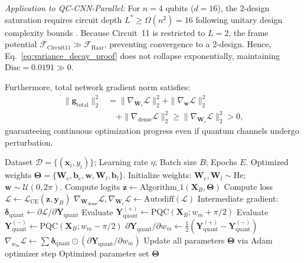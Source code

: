 \documentclass[journal]{IEEEtran}
\begin{document}
\textit{Application to QC-CNN-Parallel:} For $n=4$ qubits ($d=16$), the 2-design saturation requires circuit depth $L^* \ge \Omega(n^2) = 16$ following unitary design complexity bounds \cite{haferkamp2022linear}. Because Circuit~11 is restricted to $L=2$, the frame potential $\mathcal{F}_{\mathrm{Circuit11}} \gg \mathcal{F}_{\mathrm{Haar}}$, preventing convergence to a 2-design. Hence, Eq.~\eqref{eq:variance_decay_proof} does not collapse exponentially, maintaining $\mathrm{Disc} = 0.0191 \gg 0$.

Furthermore, total network gradient norm satisfies:
\begin{align}
\|\mathbf{g}_{\mathrm{total}}\|_2^2 &= \|\nabla_{\mathbf{W}_c} \mathcal{L}\|_2^2 + \|\nabla_{\mathbf{w}} \mathcal{L}\|_2^2 \nonumber \\
&\quad + \|\nabla_{\mathrm{dense}} \mathcal{L}\|_2^2 \ge \|\nabla_{\mathbf{W}_c} \mathcal{L}\|_2^2 > 0,
\label{eq:total_gradient_lower_bound}
\end{align}
guaranteeing continuous optimization progress even if quantum channels undergo perturbation.

\begin{algorithm}[!htbp]
\caption{Hybrid Training via Parameter-Shift Backpropagation}
\label{alg:training_loop}
\begin{algorithmic}[1]
\REQUIRE Dataset $\mathcal{D} = \{(\mathbf{x}_i, y_i)\}$; Learning rate $\eta$; Batch size $B$; Epochs $E$.
\ENSURE Optimized weights $\mathbf{\Theta} = \{\mathbf{W}_{\mathrm{c}}, \mathbf{b}_{\mathrm{c}}, \mathbf{w}, \mathbf{W}_l, \mathbf{b}_l\}$.
\STATE Initialize weights: $\mathbf{W}_{\mathrm{c}}, \mathbf{W}_l \sim \text{He}$; $\mathbf{w} \sim \mathcal{U}(0, 2\pi)$.
        \STATE Compute logits $\mathbf{z} \leftarrow \mathrm{Algorithm\_1}(\mathbf{X}_B, \mathbf{\Theta})$
        \STATE Compute loss $\mathcal{L} \leftarrow \mathcal{L}_{\mathrm{CE}}(\mathbf{z}, \mathbf{y}_B)$
        \STATE {}
        \STATE $\nabla_{\mathbf{W}_{\mathrm{dense}}} \mathcal{L}, \nabla_{\mathbf{W}_c} \mathcal{L} \leftarrow \mathrm{Autodiff}(\mathcal{L})$
        \STATE Intermediate gradient: $\boldsymbol{\delta}_{\mathrm{quant}} \leftarrow \partial \mathcal{L} / \partial \mathbf{Y}_{\mathrm{quant}}$
        \STATE {}
            \STATE Evaluate $\mathbf{Y}_{\mathrm{quant}}^{(+)} \leftarrow \mathrm{PQC}(\mathbf{X}_B; w_m + \pi/2)$
            \STATE Evaluate $\mathbf{Y}_{\mathrm{quant}}^{(-)} \leftarrow \mathrm{PQC}(\mathbf{X}_B; w_m - \pi/2)$
            \STATE $\partial \mathbf{Y}_{\mathrm{quant}}/\partial w_m \leftarrow \frac{1}{2} (\mathbf{Y}_{\mathrm{quant}}^{(+)} - \mathbf{Y}_{\mathrm{quant}}^{(-)})$
            \STATE $\nabla_{w_m} \mathcal{L} \leftarrow \sum \boldsymbol{\delta}_{\mathrm{quant}} \odot (\partial \mathbf{Y}_{\mathrm{quant}}/\partial w_m)$
        \ENDFOR
        \STATE Update all parameters $\mathbf{\Theta}$ via Adam optimizer step
    \ENDFOR
\ENDFOR
\RETURN Optimized parameter set $\mathbf{\Theta}$
\end{algorithmic}
\end{algorithm}
\end{document}
